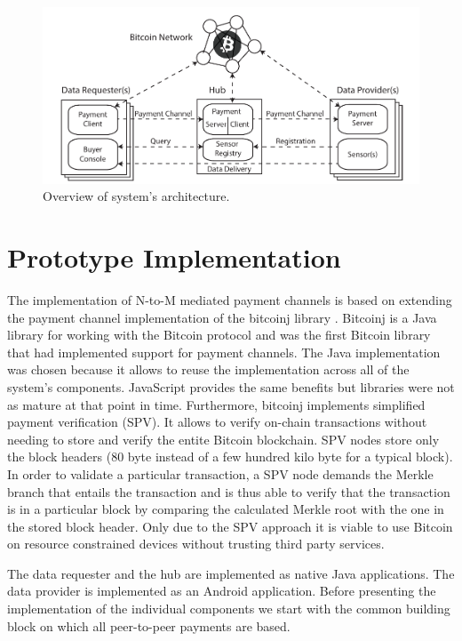 \documentclass[10pt,journal,compsoc]{IEEEtran}
\begin{document}
 \begin{figure}
 \includegraphics{Architecture.pdf}
 \caption{Overview of system's architecture.}
 \label{fig:architecture}
 \end{figure}

\section{Prototype Implementation}
\label{sec:implementation}

The implementation of N-to-M mediated payment channels is based on extending the payment channel implementation of the bitcoinj library \cite{Bitcoinj}. Bitcoinj is a Java library for working with the Bitcoin protocol and was the first Bitcoin library that had implemented support for payment channels. The Java implementation was chosen because it allows to reuse the implementation across all of the system's components. JavaScript provides the same benefits but libraries were not as mature at that point in time. Furthermore, bitcoinj implements simplified payment verification (SPV). It allows to verify on-chain transactions without needing to store and verify the entite Bitcoin blockchain. SPV nodes store only the block headers (80 byte instead of a few hundred kilo byte for a typical block). In order to validate a particular transaction, a SPV node demands the Merkle branch that entails the transaction and is thus able to verify that the transaction is in a particular block by comparing the calculated Merkle root with the one in the stored block header. Only due to the SPV approach it is viable to use Bitcoin on resource constrained devices without trusting third party services.

The data requester and the hub are implemented as native Java applications. The data provider is implemented as an Android application. Before presenting the implementation of the individual components we start with the common building block on which all peer-to-peer payments are based. 
\end{document}
